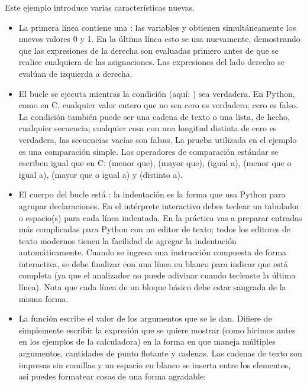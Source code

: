 \documentclass[a4,10pt,spanish]{sphinxmanual}
\begin{document}
\sphinxAtStartPar
Este ejemplo introduce varias características nuevas.
\begin{itemize}
\item {} 
\sphinxAtStartPar
La primera línea contiene una : las variables  y  obtienen simultáneamente los nuevos valores 0 y 1. En la última línea esto se usa nuevamente, demostrando que las expresiones de la derecha son evaluadas primero antes de que se realice cualquiera de las asignaciones. Las expresiones del lado derecho se evalúan de izquierda a derecha.

\item {} 
\sphinxAtStartPar
El bucle  se ejecuta mientras la condición (aquí: ) sea verdadera. En Python, como en C, cualquier valor entero que no sea cero es verdadero; cero es falso. La condición también puede ser una cadena de texto o una lista, de hecho, cualquier secuencia; cualquier cosa con una longitud distinta de cero es verdadera, las secuencias vacías son falsas. La prueba utilizada en el ejemplo es una comparación simple. Los operadores de comparación estándar se escriben igual que en C: \sphinxcode{\sphinxupquote{<}} (menor que), \sphinxcode{\sphinxupquote{>}} (mayor que), \sphinxcode{\sphinxupquote{==}} (igual a), \sphinxcode{\sphinxupquote{<=}} (menor que o igual a), \sphinxcode{\sphinxupquote{>=}} (mayor que o igual a) y \sphinxcode{\sphinxupquote{!=}} (distinto a).

\item {} 
\sphinxAtStartPar
El cuerpo del bucle está : la indentación es la forma que usa Python para agrupar declaraciones. En el intérprete interactivo debes teclear un tabulador o espacio(s) para cada línea indentada. En la práctica vas a preparar entradas más complicadas para Python con un editor de texto; todos los editores de texto modernos tienen la facilidad de agregar la indentación automáticamente. Cuando se ingresa una instrucción compuesta de forma interactiva, se debe finalizar con una línea en blanco para indicar que está completa (ya que el analizador no puede adivinar cuando tecleaste la última línea). Nota que cada línea de un bloque básico debe estar sangrada de la misma forma.

\item {} 
\sphinxAtStartPar
La función  escribe el valor de los argumentos que se le dan. Difiere de simplemente escribir la expresión que se quiere mostrar (como hicimos antes en los ejemplos de la calculadora) en la forma en que maneja múltiples argumentos, cantidades de punto flotante y cadenas. Las cadenas de texto son impresas sin comillas y un espacio en blanco se inserta entre los elementos, así puedes formatear cosas de una forma agradable:


\end{itemize}
\end{document}
